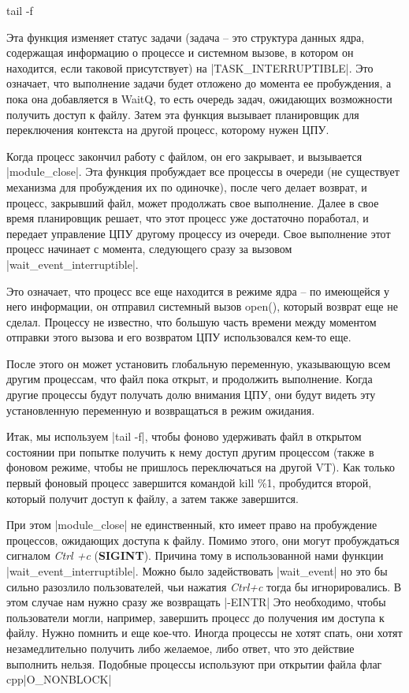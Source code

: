 \documentclass[10pt, oneside]{book}
\begin{document}
\begin{codebash}
tail -f
\end{codebash}

Эта функция изменяет статус задачи (задача – это структура данных ядра, содержащая информацию о процессе и системном вызове, в котором он находится, если таковой присутствует) на \cpp|TASK_INTERRUPTIBLE|. Это означает, что выполнение задачи будет отложено до момента ее пробуждения, а пока она добавляется в WaitQ, то есть очередь задач, ожидающих возможности получить доступ к файлу. Затем эта функция вызывает планировщик для переключения контекста на другой процесс, которому нужен ЦПУ.

Когда процесс закончил работу с файлом, он его закрывает, и вызывается \cpp|module_close|. Эта функция пробуждает все процессы в очереди (не существует механизма для пробуждения их по одиночке), после чего делает возврат, и процесс, закрывший файл, может продолжать свое выполнение. Далее в свое время планировщик решает, что этот процесс уже достаточно поработал, и передает управление ЦПУ другому процессу из очереди. Свое выполнение этот процесс начинает с момента, следующего сразу за вызовом \cpp|wait_event_interruptible|.

Это означает, что процесс все еще находится в режиме ядра – по имеющейся у него информации, он отправил системный вызов open(), который возврат еще не сделал. Процессу не известно, что большую часть времени между моментом отправки этого вызова и его возвратом ЦПУ использовался кем-то еще.

После этого он может установить глобальную переменную, указывающую всем другим процессам, что файл пока открыт, и продолжить выполнение. Когда другие процессы будут получать долю внимания ЦПУ, они будут видеть эту установленную переменную и возвращаться в режим ожидания.

Итак, мы используем \sh|tail -f|, чтобы фоново удерживать файл в открытом состоянии при попытке получить к нему доступ другим процессом (также в фоновом режиме, чтобы не пришлось переключаться на другой VT). Как только первый фоновый процесс завершится командой kill \%1, пробудится второй, который получит доступ к файлу, а затем также завершится.

При этом \cpp|module_close| не единственный, кто имеет право на пробуждение процессов,
ожидающих доступа к файлу. Помимо этого, они могут пробуждаться сигналом \emph{Ctrl +c} (\textbf{SIGINT}). Причина тому в использованной нами функции \cpp|wait_event_interruptible|.
Можно было задействовать \cpp|wait_event| но это бы сильно разозлило пользователей, чьи нажатия \emph{Ctrl+c} тогда бы игнорировались.
В этом случае нам нужно сразу же возвращать \cpp|-EINTR| Это необходимо, чтобы пользователи могли, например, завершить процесс до получения им доступа к файлу. Нужно помнить и еще кое-что. Иногда процессы не хотят спать, они хотят незамедлительно получить либо желаемое, либо ответ, что это действие выполнить нельзя. Подобные процессы используют при открытии файла флаг cpp|O_NONBLOCK|
\end{document}
